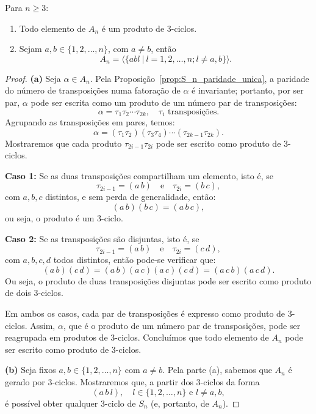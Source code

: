 \documentclass[11pt,openany]{book}
\newcommand{\gen}[1]{\ensuremath{\langle #1\rangle}}
\begin{document}
\begin{proposition}
\label{prop:A_n_3_ciclos}
    Para $n \geq 3$:
    \begin{enumerate}[label=\alph*)]
        \item Todo elemento de $A_n$ é um produto de 3-ciclos.
        \item Sejam $a, b \in \{1,2,\dots,n\}$, com $a \not= b$, então
        \[A_n = \gen{\{abl \ | \ l = 1,2,\dots,n; l \not= a,b \}}.\]
    \end{enumerate}
\end{proposition}
\begin{proof}
    \textbf{(a)} Seja \(\alpha\in A_n\). Pela Proposição~\ref{prop:S_n_paridade_unica}, a paridade do número de transposições numa fatoração de \(\alpha\) é invariante; portanto, por ser par, \(\alpha\) pode ser escrita como um produto de um número par de transposições:
\[
\alpha = \tau_1\tau_2\cdots\tau_{2k}, \quad \tau_i\text{ transposições}.
\]
Agrupando as transposições em pares, temos:
\[
\alpha = (\tau_1\tau_2)(\tau_3\tau_4)\cdots(\tau_{2k-1}\tau_{2k}).
\]
Mostraremos que cada produto \(\tau_{2i-1}\tau_{2i}\) pode ser escrito como produto de \(3\)-ciclos.

\textbf{Caso 1:} Se as duas transposições compartilham um elemento, isto é, se
\[
\tau_{2i-1}=(a\,b)\quad \text{e}\quad \tau_{2i}=(b\,c),
\]
com \(a,b,c\) distintos, e sem perda de generalidade, então:
\[
(a\,b)(b\,c) = (a\,b\,c),
\]
ou seja, o produto é um \(3\)-ciclo.

\textbf{Caso 2:} Se as transposições são disjuntas, isto é, se
\[
\tau_{2i-1}=(a\,b)\quad \text{e}\quad \tau_{2i}=(c\,d),
\]
com \(a,b,c,d\) todos distintos, então pode-se verificar que:
\[
(a\,b)(c\,d) = (a\,b)(a\,c)(a\,c)(c\,d) = (a\,c\,b)(a\,c\,d).
\]
Ou seja, o produto de duas transposições disjuntas pode ser escrito como produto de dois \(3\)-ciclos.

Em ambos os casos, cada par de transposições é expresso como produto de \(3\)-ciclos. Assim, \(\alpha\), que é o produto de um número par de transposições, pode ser reagrupada em produtos de \(3\)-ciclos. Concluímos que todo elemento de \(A_n\) pode ser escrito como produto de \(3\)-ciclos.

\medskip

\textbf{(b)} Seja fixos \(a,b\in\{1,2,\dots,n\}\) com \(a\neq b\). Pela parte (a), sabemos que \(A_n\) é gerado por \(3\)-ciclos. Mostraremos que, a partir dos \(3\)-ciclos da forma
\[
(a\,b\,l),\quad l\in \{1,2,\dots,n\} \text{ e } l\neq a,b,
\]
é possível obter qualquer \(3\)-ciclo de \(S_n\) (e, portanto, de \(A_n\)).


\end{proof}
\end{document}
